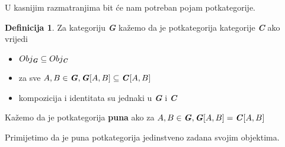 \documentclass[11pt]{article}
\newcommand{\category}[1]{\textbf{\emph{#1}}}
\theoremstyle{definition}
\newtheorem{definition}{Definicija}
\begin{document}
  U kasnijim razmatranjima bit će nam potreban pojam potkategorije.
  \begin{definition}
    Za kategoriju \category{G} kažemo da je potkategorija kategorije
    \category{C} ako vrijedi
    \begin{itemize}
      \item $Obj_\category{G} \subseteq Obj_\category{C}$
      \item za sve $A, B \in \category{G}, \category{G}[A, B] \subseteq
        \category{C}[A, B]$
      \item kompozicija i identitata su jednaki u \category{G} i \category{C}
    \end{itemize}
    Kažemo da je potkategorija \textbf{puna} ako za $A, B \in \category{G},
    \category{G}[A, B] = \category{C}[A, B]$
  \end{definition}
  Primijetimo da je puna potkategorija jedinstveno zadana svojim objektima.
  \newpage
\end{document}
